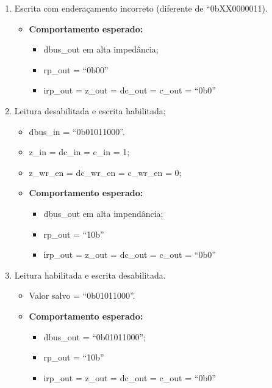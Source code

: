 \documentclass{article}
\begin{document}
\begin{enumerate}
    \item Escrita com enderaçamento incorreto (diferente de ``0bXX0000011).
    \begin{itemize}
        \item \textbf{Comportamento esperado:}
        \begin{itemize}
            \item dbus\_out em alta impedância;
            \item rp\_out = ``0b00''
            \item irp\_out = z\_out = dc\_out = c\_out = ``0b0''
        \end{itemize}
    \end{itemize}
    
    \item Leitura desabilitada e escrita habilitada;
    \begin{itemize}
        \item dbus\_in = ``0b01011000''.\
        \item z\_in = dc\_in = c\_in = 1;
        \item z\_wr\_en = dc\_wr\_en = c\_wr\_en = 0;
        \item \textbf{Comportamento esperado:}
        \begin{itemize}
            \item dbus\_out em alta impendância;
            \item rp\_out = ``10b''
            \item irp\_out = z\_out = dc\_out = c\_out = ``0b0''
        \end{itemize}
    \end{itemize}

    \item Leitura habilitada e escrita desabilitada.
    \begin{itemize}
        \item Valor salvo = ``0b01011000''.
        \item \textbf{Comportamento esperado:}
        \begin{itemize}
            \item dbus\_out = ``0b01011000'';
            \item rp\_out = ``10b''
            \item irp\_out = z\_out = dc\_out = c\_out = ``0b0''
        \end{itemize}
    \end{itemize}


\end{enumerate}
\end{document}
